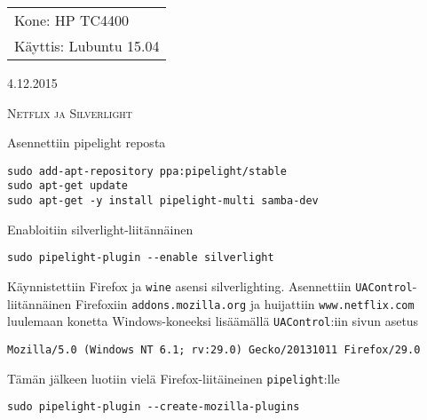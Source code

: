 \documentclass[main.tex]{subfiles}
\begin{document}
\thispagestyle{empty}
\begin{tabular}[t]{l}
Kone: HP TC4400\\
Käyttis: Lubuntu 15.04
\end{tabular}
\hfill 4.12.2015

{\scshape\Large{Netflix ja Silverlight}}

Asennettiin pipelight reposta

\begin{lstlisting}
sudo add-apt-repository ppa:pipelight/stable
sudo apt-get update
sudo apt-get -y install pipelight-multi samba-dev
\end{lstlisting}

Enabloitiin silverlight-liitännäinen

\begin{lstlisting}
sudo pipelight-plugin --enable silverlight
\end{lstlisting}

Käynnistettiin Firefox ja \texttt{wine} asensi silverlighting. Asennettiin \texttt{UAControl}-liitännäinen Firefoxiin \texttt{addons.mozilla.org} ja huijattiin \texttt{www.netflix.com} luulemaan konetta Windows-koneeksi lisäämällä \texttt{UAControl}:iin sivun asetus

\begin{lstlisting}
Mozilla/5.0 (Windows NT 6.1; rv:29.0) Gecko/20131011 Firefox/29.0
\end{lstlisting}

Tämän jälkeen luotiin vielä Firefox-liitäineinen \texttt{pipelight}:lle

\begin{lstlisting}
sudo pipelight-plugin --create-mozilla-plugins
\end{lstlisting}
\end{document}
